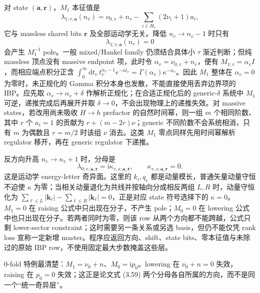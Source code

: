 \documentclass[11pt,a4paper]{ctexart}
\newcommand{\dd}{\mathrm d}
\newcommand{\ii}{\mathrm i}
\begin{document}
对 state $(\bm a,\bm r)$，$M_1$ 本征值是
\begin{equation}
 \lambda_{1;v,\bm a}(n_v)
 =\nu_{0,v}+n_v
 -\sum_{i\in H_v}(2\nu_i+1)a_i,
 \label{eq:M1-general-eigenvalue}
\end{equation}
它与 massless shared bits $\bm r$ 及全部运动学无关。降低 $n_v\to n_v-1$ 时只有
\begin{equation}
 \lambda_{1;v,\bm a}(n_v)=0
 \label{eq:M1-lowering-resonance}
\end{equation}
会产生 $M_1^{-1}$ pole。一般 mixed/Hankel family 仍须结合具体小 $\tau$ 渐近判断；但纯 massless 顶点没有 massive endpoint 项，此时令 $\alpha_v=\nu_{0,v}+n_v$，便有 $M_{1;v}=\alpha_v I$，而相应端点积分正含 $\int_0^\infty\!\dd t_v\,t_v^{\alpha_v-1}e^{-\kappa t_v}=\Gamma(\alpha_v)\kappa^{-\alpha_v}$。因此 $M_1$ 整体在 $\alpha_v=0$ 为零时，未正规化的 Gamma 积分本身也发散，不能直接使用丢弃边界项的 IBP。应先取 $\alpha_v\to\alpha_v+\delta$ 作解析正规化；在合适正规化后的 generic-$\delta$ 系统中 $M_1$ 可逆，递推完成后再展开并取 $\delta\to0$，不会出现物理上的递推失效。对 massive states，若改用尚未吸收 $H\to h$ prefactor 的自然时间幂，则一组 $m$ 个相同阶数、其中 $r$ 个 $a_i=1$ 的贡献为 $r+(m-2r)\nu$；generic 不同阶数不会系统相消，只有 $m$ 为偶数且 $r=m/2$ 时该组 $\nu$ 消去。这类 $M_1$ 零点同样先用时间幂解析 regulator 移开，再在 generic regulator 下递推。

反方向升高 $n_v\to n_v+1$ 时，分母是
\begin{equation}
 \lambda_{0;v,\bm a,\bm r}
 =\ii\kappa_{v,s;\bm a,\bm r},
 \qquad
 \kappa_{v,s;\bm a,\bm r}=0.
 \label{eq:M0-raising-resonance}
\end{equation}
这是运动学 energy-letter 奇异面。这里的 $k_i,q_e$ 都是动量模长，普通矢量动量守恒不迫使 $\kappa$ 为零；当相关动量退化为共线并按轴向分成相反两组 $L,R$ 时，动量守恒化为 $\sum_{\ell\in L}|\bm k_\ell|-\sum_{\ell\in R}|\bm k_\ell|=0$，正是对应 state 符号选择下的 $\kappa=0$。$M_1=0$ 在 raising 公式中只出现在分子，不产生 pole；$M_0=0$ 在 lowering 公式中也只出现在分子。若两者同时为零，则该 row 从两个方向都不能跨越，公式只剩 lower-sector constraint；这时需要另一条关系或另选 basis，但仍不能仅凭 rank loss 宣称一定新增 master。程序应返回方向、shift、state bits、零本征值与未除过的原始 IBP row，不使用固定最大步数掩盖这些层。

0-fold 特例最清楚：$M_1=\nu_0+n$、$M_0=\ii p_0$。lowering 在 $\nu_0+n=0$ 失效，raising 在 $p_0=0$ 失效；这正是论文式 (3.59) 两个分母各自所属的方向，而不是同一个“统一奇异层”。
\end{document}
